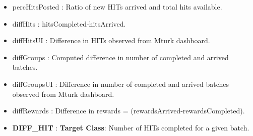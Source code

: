 \begin{itemize}[noitemsep,topsep=0pt,parsep=0pt,partopsep=0pt]
\item percHitsPosted : Ratio of new HITs arrived and total hits available.
\item diffHits : hitsCompleted-hitsArrived.
\item diffHitsUI : Difference in HITs observed from Mturk dashboard.
\item diffGroups  : Computed difference in number of completed and arrived batches.
\item diffGroupsUI : Difference in number of completed and arrived batches observed from Mturk dashboard.
\item diffRewards : Difference in rewards = (rewardsArrived-rewardsCompleted).
\item \textbf{DIFF\_HIT}  :  \textbf{Target Class}: Number of HITs completed for a given batch.
\end{itemize}